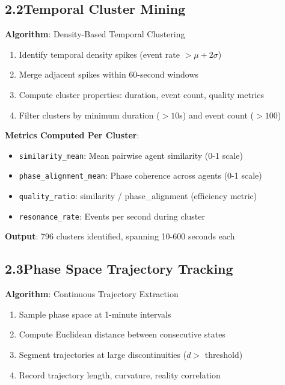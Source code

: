 \documentclass[11pt]{article}
\begin{document}
\subsection*{2.2\quad Temporal Cluster Mining}

\noindent\textbf{Algorithm}: Density-Based Temporal Clustering

\begin{enumerate}
    \item Identify temporal density spikes (event rate $> \mu + 2\sigma$)
    \item Merge adjacent spikes within 60-second windows
    \item Compute cluster properties: duration, event count, quality metrics
    \item Filter clusters by minimum duration ($>10$s) and event count ($>100$)
\end{enumerate}

\noindent\textbf{Metrics Computed Per Cluster}:
\begin{itemize}
    \item \texttt{similarity\_mean}: Mean pairwise agent similarity (0-1 scale)
    \item \texttt{phase\_alignment\_mean}: Phase coherence across agents (0-1 scale)
    \item \texttt{quality\_ratio}: similarity / phase\_alignment (efficiency metric)
    \item \texttt{resonance\_rate}: Events per second during cluster
\end{itemize}

\noindent\textbf{Output}: 796 clusters identified, spanning 10-600 seconds each

\subsection*{2.3\quad Phase Space Trajectory Tracking}

\noindent\textbf{Algorithm}: Continuous Trajectory Extraction

\begin{enumerate}
    \item Sample phase space at 1-minute intervals
    \item Compute Euclidean distance between consecutive states
    \item Segment trajectories at large discontinuities ($d > $ threshold)
    \item Record trajectory length, curvature, reality correlation
\end{enumerate}
\end{document}
